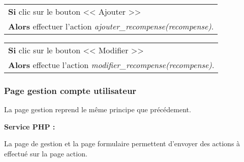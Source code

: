             \begin{center}
                \begin{tabular}{l}
                    \textbf{Si} clic sur le bouton << Ajouter >> \\
                    \textbf{Alors} effectuer l'action \emph{ajouter\_recompense(recompense)}.
                \end{tabular}
            \end{center}
            
            
            \begin{center}
                \begin{tabular}{l}
                    \textbf{Si} clic sur le bouton << Modifier >> \\
                    \textbf{Alors} effectue l'action \emph{modifier\_recompense(recompense)}.
                \end{tabular}
            \end{center}
            
        
        \newpage

		\subsubsection{Page gestion compte utilisateur}

			\begin{paragraphe}
                La page gestion reprend le même principe que précédement.
			\end{paragraphe}

			\begin{paragraphe}
				\textbf{Service PHP :}
			\end{paragraphe}
            
            \begin{paragraphe}
                La page de gestion et la page formulaire permettent d'envoyer des actions à effectué sur la page action.
			\end{paragraphe}

